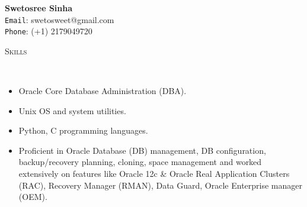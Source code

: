 \documentclass[9pt]{article}
\newenvironment{changemargin}[2]{%
  \begin{list}{}{%
    \setlength{\topsep}{0pt}%
    \setlength{\leftmargin}{#1}%
    \setlength{\rightmargin}{#2}%
    \setlength{\listparindent}{\parindent}%
    \setlength{\itemindent}{\parindent}%
    \setlength{\parsep}{\parskip}%
  }%
  \item[]}{\end{list}
}
\newcommand{\lineover}{
	\begin{changemargin}{-0.05in}{-0.05in}
		\vspace*{-8pt}
		\hrulefill \\
		\vspace*{-2pt}
	\end{changemargin}
}
\newcommand{\header}[1]{
	\begin{changemargin}{-0.5in}{-0.5in}
		\scshape{#1}\\
  	\lineover
	\end{changemargin}
}
\newenvironment{body} {
	\vspace*{-16pt}
	\begin{changemargin}{-0.25in}{-0.5in}
  }
	{\end{changemargin}
}
\begin{document}
	\begin{changemargin}{-0.5in}{-0.5in}
\begin{center}
 {\Large \textbf{Swetosree Sinha}} \\
 {{\texttt{Email}: swetosweet@gmail.com}} \\
 {{\texttt{Phone}: (+1) 2179049720}} \\
\end{center}

\end{changemargin}


\header{Skills}
\begin{body}
	\vspace{14pt}
	\begin{itemize} \itemsep -0pt
    \item Oracle Core Database Administration (DBA).
    \item Unix OS and system utilities.
    \item Python, C programming languages.
    \item Proficient in Oracle Database (DB) management, DB configuration, backup/recovery planning, cloning, space management and worked extensively on features like Oracle 12c \& Oracle Real Application Clusters (RAC), Recovery Manager (RMAN), Data Guard, Oracle Enterprise manager (OEM).
	  \end{itemize}

        \medskip
\end{body}


\smallskip
\end{document}
